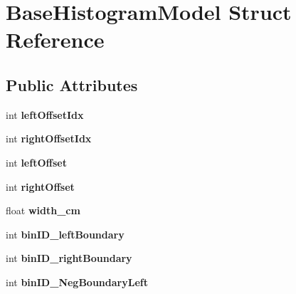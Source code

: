 \hypertarget{structBaseHistogramModel}{\section{Base\-Histogram\-Model Struct Reference}
\label{structBaseHistogramModel}
}
\subsection*{Public Attributes}
\begin{DoxyCompactItemize}
\item 
\hypertarget{structBaseHistogramModel_ae129cc9360fe03bc507b9fc89f455025}{int {\bfseries left\-Offset\-Idx}}\label{structBaseHistogramModel_ae129cc9360fe03bc507b9fc89f455025}

\item 
\hypertarget{structBaseHistogramModel_abbcbeba514302e037328fde2f60ea068}{int {\bfseries right\-Offset\-Idx}}\label{structBaseHistogramModel_abbcbeba514302e037328fde2f60ea068}

\item 
\hypertarget{structBaseHistogramModel_ab6e7d8809d74a9fa63b182e695727738}{int {\bfseries left\-Offset}}\label{structBaseHistogramModel_ab6e7d8809d74a9fa63b182e695727738}

\item 
\hypertarget{structBaseHistogramModel_a72b2b16eed857713bd39d38d02d8b79f}{int {\bfseries right\-Offset}}\label{structBaseHistogramModel_a72b2b16eed857713bd39d38d02d8b79f}

\item 
\hypertarget{structBaseHistogramModel_a1da0e4b89eeeb6185fdb31ba6e5af0f3}{float {\bfseries width\-\_\-cm}}\label{structBaseHistogramModel_a1da0e4b89eeeb6185fdb31ba6e5af0f3}

\item 
\hypertarget{structBaseHistogramModel_a99cfaa485a8c836e196cf4b36d30c913}{int {\bfseries bin\-I\-D\-\_\-left\-Boundary}}\label{structBaseHistogramModel_a99cfaa485a8c836e196cf4b36d30c913}

\item 
\hypertarget{structBaseHistogramModel_abb73c06cd993b879c00c5a8351516f43}{int {\bfseries bin\-I\-D\-\_\-right\-Boundary}}\label{structBaseHistogramModel_abb73c06cd993b879c00c5a8351516f43}

\item 
\hypertarget{structBaseHistogramModel_a0bea845eaa4a3449c5a0b5fff53cf1c7}{int {\bfseries bin\-I\-D\-\_\-\-Neg\-Boundary\-Left}}\label{structBaseHistogramModel_a0bea845eaa4a3449c5a0b5fff53cf1c7}


\end{DoxyCompactItemize}
